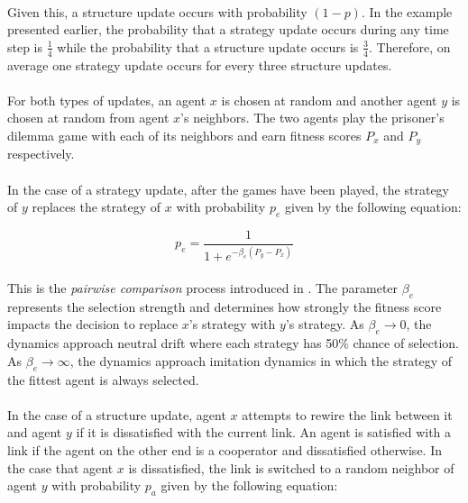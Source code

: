 \documentclass{article}
\begin{document}
	\paragraph{}Given this, a structure update occurs with probability $(1-p)$.  In the example presented earlier, the probability that a strategy update occurs during any time step is $\frac{1}{4}$ while the probability that a structure update occurs is $\frac{3}{4}$.  Therefore, on average one strategy update occurs for every three structure updates.
	\paragraph{}For both types of updates, an agent $x$ is chosen at random and another agent $y$ is chosen at random from agent $x$'s neighbors.  The two agents play the prisoner's dilemma game with each of its neighbors and earn fitness scores $P_x$ and $P_y$ respectively.
	\paragraph{}In the case of a strategy update, after the games have been played, the strategy of $y$ replaces the strategy of $x$ with probability $p_e$ given by the following equation:

	\begin{equation}
	p_e=\frac{1}{1+e^{-\beta_e(P_y-P_x)}	}	
	\end{equation}

	\paragraph{}This is the \textit{pairwise comparison} process introduced in \cite{Traulsen2006}.  The parameter $\beta_e$ represents the selection strength and determines how strongly the fitness score impacts the decision to replace $x$'s strategy with $y$'s strategy.  As $\beta_e\to0$, the dynamics approach neutral drift where each strategy has 50\% chance of selection.  As $\beta_e\to\infty$, the dynamics approach imitation dynamics in which the strategy of the fittest agent is always selected.
	\paragraph{}In the case of a structure update, agent $x$ attempts to rewire the link between it and agent $y$ if it is dissatisfied with the current link.  An agent is satisfied with a link if the agent on the other end is a cooperator and dissatisfied otherwise.  In the case that agent $x$ is dissatisfied, the link is switched to a random neighbor of agent $y$ with probability $p_a$ given by the following equation:
	
\end{document}
